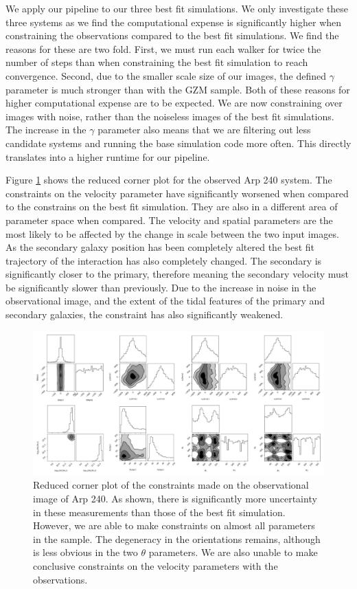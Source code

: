 We apply our pipeline to our three best fit simulations. We only investigate these three systems as we find the computational expense is significantly higher when constraining the observations compared to the best fit simulations. We find the reasons for these are two fold. First, we must run each walker for twice the number of steps than when constraining the best fit simulation to reach convergence. Second, due to the smaller scale size of our images, the defined $\gamma$ parameter is much stronger than with the GZM sample. Both of these reasons for higher computational expense are to be expected. We are now constraining over images with noise, rather than the noiseless images of the best fit simulations. The increase in the $\gamma$ parameter also means that we are filtering out less candidate systems and running the base simulation code more often. This directly translates into a higher runtime for our pipeline.

Figure \ref{fig:obs_corner_plot} shows the reduced corner plot for the observed Arp 240 system. The constraints on the velocity parameter have significantly worsened when compared to the constrains on the best fit simulation. They are also in a different area of parameter space when compared. The velocity and spatial parameters are the most likely to be affected by the change in scale between the two input images. As the secondary galaxy position has been completely altered the best fit trajectory of the interaction has also completely changed. The secondary is significantly closer to the primary, therefore meaning the secondary velocity must be significantly slower than previously. Due to the increase in noise in the observational image, and the extent of the tidal features of the primary and secondary galaxies, the constraint has also significantly weakened.

\begin{figure}
    \centering
    \includegraphics[width=\textwidth]{Chapter1/figures/Arp240-red-corner-obs.pdf}
    \caption{Reduced corner plot of the constraints made on the observational image of Arp 240. As shown, there is significantly more uncertainty in these measurements than those of the best fit simulation. However, we are able to make constraints on almost all parameters in the sample. The degeneracy in the orientations remains, although is less obvious in the two $\theta$ parameters. We are also unable to make conclusive constraints on the velocity parameters with the observations.}
    \label{fig:obs_corner_plot}
\end{figure}

